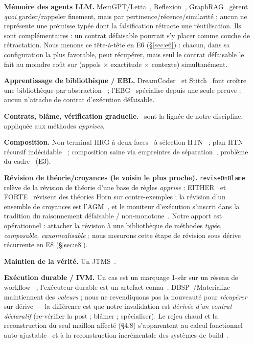 \documentclass[11pt]{article}
\begin{document}
\textbf{Mémoire des agents LLM.} MemGPT/Letta~\cite{packer2023}, Reflexion~\cite{shinn2023}, GraphRAG~\cite{edge2024}
gèrent \emph{quoi} garder/rappeler finement, mais par pertinence/récence/similarité ; aucun ne représente une
prémisse typée dont la falsification rétracte une réutilisation. Ils sont complémentaires : un contrat défaisable
pourrait s'y placer comme couche de rétractation. Nous menons ce tête-à-tête en E6 (\S\ref{sec:e6}) : chacun, dans
sa configuration la plus favorable, peut récupérer, mais seul le contrat défaisable le fait au moindre coût sur
(appels $\times$ exactitude $\times$ contexte) simultanément.

\textbf{Apprentissage de bibliothèque / EBL.} DreamCoder~\cite{ellis2021} et Stitch~\cite{bowers2023} font croître une
bibliothèque par abstraction~\cite{plotkin1970} ; l'EBG~\cite{mitchell1986} spécialise depuis une seule preuve ;
aucun n'attache de contrat d'exécution défaisable.

\textbf{Contrats, blâme, vérification graduelle.}~\cite{findler2002,bader2018} sont la lignée de notre discipline,
appliquée aux méthodes \emph{apprises}.

\textbf{Composition.} Non-terminal HRG à deux faces~\cite{habel1992,drewes1997,courcelle1990} à sélection
HTN~\cite{erol1994} ; plan HTN récursif indécidable~\cite{erol1996} ; composition saine via empreintes de
séparation~\cite{ohearn2001,reynolds2002}, problème du cadre~\cite{mccarthy1969} (E3).

\textbf{Révision de théorie/croyances (le voisin le plus proche).} \texttt{reviseOnBlame} relève de la révision de
théorie d'une base de règles \emph{apprise} : EITHER~\cite{ourston1994} et FORTE~\cite{richards1995} révisent des
théories Horn sur contre-exemples ; la révision d'un ensemble de croyances est l'AGM~\cite{agm1985}, et le moniteur
d'exécution s'inscrit dans la tradition du raisonnement défaisable / non-monotone~\cite{reiter1980}. Notre apport
est opérationnel : attacher la révision à une bibliothèque de méthodes \emph{typée, composable, canonicalisable} ;
nous mesurons cette étape de révision sous dérive récurrente en E8 (\S\ref{sec:e8}).

\textbf{Maintien de la vérité.} Un JTMS~\cite{doyle1979,dekleer1986}.

\textbf{Exécution durable / IVM.} Un cas est un marquage 1-sûr sur un réseau de workflow~\cite{vanderaalst1998} ;
l'exécuteur durable est un artefact connu~\cite{aws2022,dbos2022}. DBSP~\cite{budiu2023}/Materialize maintiennent
des \emph{valeurs} ; nous ne revendiquons pas la nouveauté pour \emph{récupérer} sur dérive --- la différence est
que notre invalidation est \emph{dérivée d'un contrat déclaratif} (re-vérifier la post ; blâmer ; spécialiser). Le
rejeu chaud et la reconstruction du seul maillon affecté (\S4.8) s'apparentent au calcul fonctionnel
auto-ajustable~\cite{acar2002} et à la reconstruction incrémentale des systèmes de build~\cite{mokhov2018}.
\end{document}

